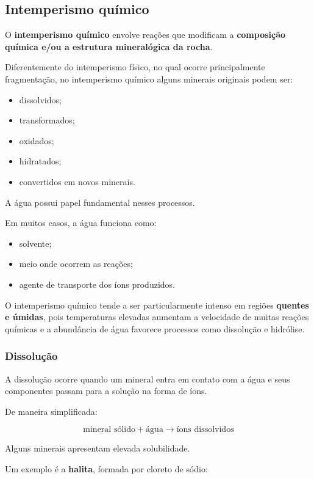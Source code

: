 \subsection{Intemperismo químico}

O \textbf{intemperismo químico} envolve reações que modificam a \textbf{composição química e/ou a estrutura mineralógica da rocha}.

Diferentemente do intemperismo físico, no qual ocorre principalmente fragmentação, no intemperismo químico alguns minerais originais podem ser:

\begin{itemize}
    \item dissolvidos;
    \item transformados;
    \item oxidados;
    \item hidratados;
    \item convertidos em novos minerais.
\end{itemize}

A água possui papel fundamental nesses processos.

Em muitos casos, a água funciona como:

\begin{itemize}
    \item solvente;
    \item meio onde ocorrem as reações;
    \item agente de transporte dos íons produzidos.
\end{itemize}

O intemperismo químico tende a ser particularmente intenso em regiões \textbf{quentes e úmidas}, pois temperaturas elevadas aumentam a velocidade de muitas reações químicas e a abundância de água favorece processos como dissolução e hidrólise.

\subsubsection{Dissolução}

A dissolução ocorre quando um mineral entra em contato com a água e seus componentes passam para a solução na forma de íons.

De maneira simplificada:

\[
\text{mineral sólido} + \text{água}
\rightarrow
\text{íons dissolvidos}
\]

Alguns minerais apresentam elevada solubilidade.

Um exemplo é a \textbf{halita}, formada por cloreto de sódio:

